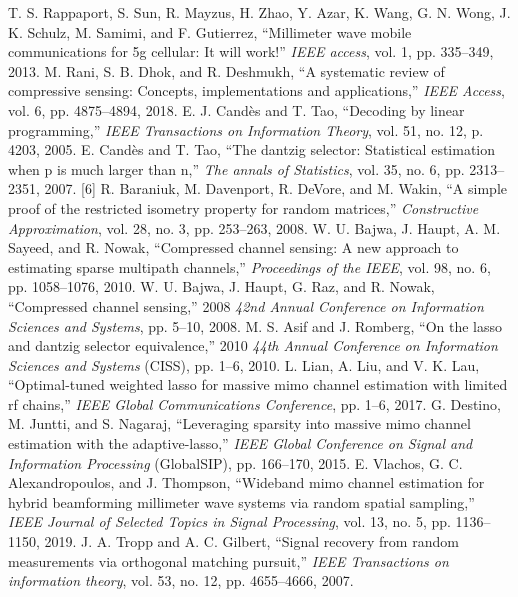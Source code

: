 \documentclass[journal]{IEEEtran}
\begin{document}
\begin{thebibliography}{30}
T. S. Rappaport, S. Sun, R. Mayzus, H. Zhao, Y. Azar, K. Wang, G. N. Wong, J. K. Schulz, M. Samimi, and F. Gutierrez, “Millimeter wave mobile communications for 5g cellular: It will work!” \textit {IEEE access}, vol. 1, pp. 335–349, 2013.
M. Rani, S. B. Dhok, and R. Deshmukh, “A systematic review of compressive sensing: Concepts, implementations and applications,” \textit {IEEE Access}, vol. 6, pp. 4875–4894, 2018.
E. J. Candès and T. Tao, “Decoding by linear programming,” \textit {IEEE Transactions on Information Theory}, vol. 51, no. 12, p. 4203, 2005.
E. Candès and T. Tao, “The dantzig selector: Statistical estimation when p is much larger than n,” \textit {The annals of Statistics}, vol. 35, no. 6, pp. 2313–2351, 2007.
[6] R. Baraniuk, M. Davenport, R. DeVore, and M. Wakin, “A simple proof of the restricted isometry property for random matrices,” \textit {Constructive Approximation}, vol. 28, no. 3, pp. 253–263, 2008.
W. U. Bajwa, J. Haupt, A. M. Sayeed, and R. Nowak, “Compressed channel sensing: A new approach to estimating sparse multipath channels,” \textit {Proceedings of the IEEE}, vol. 98, no. 6, pp. 1058–1076, 2010.
W. U. Bajwa, J. Haupt, G. Raz, and R. Nowak, “Compressed channel sensing,” 2008 \textit {42nd Annual Conference on Information Sciences and Systems}, pp. 5–10, 2008.
M. S. Asif and J. Romberg, “On the lasso and dantzig selector equivalence,” 2010 \textit {44th Annual Conference on Information Sciences and Systems} (CISS), pp. 1–6, 2010.
L. Lian, A. Liu, and V. K. Lau, “Optimal-tuned weighted lasso for massive mimo channel estimation with limited rf chains,” \textit {IEEE Global Communications Conference}, pp. 1–6, 2017.
G. Destino, M. Juntti, and S. Nagaraj, “Leveraging sparsity into massive mimo channel estimation with the adaptive-lasso,” \textit {IEEE Global Conference on Signal and Information Processing} (GlobalSIP), pp. 166–170, 2015.
E. Vlachos, G. C. Alexandropoulos, and J. Thompson, “Wideband mimo channel estimation for hybrid beamforming millimeter wave systems via random spatial sampling,” \textit {IEEE Journal of Selected Topics in Signal Processing}, vol. 13, no. 5, pp. 1136–1150, 2019.
J. A. Tropp and A. C. Gilbert, “Signal recovery from random measurements via orthogonal matching pursuit,” \textit {IEEE Transactions on information theory}, vol. 53, no. 12, pp. 4655–4666, 2007.

\end{thebibliography}
\end{document}
